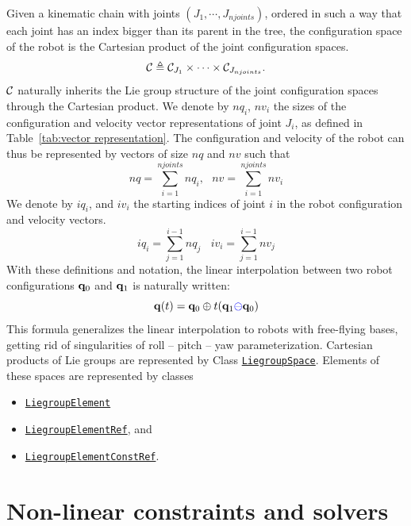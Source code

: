 Given a kinematic chain with joints $(J_1, \cdots, J_{njoints})$, ordered in such
a way that each joint has an index bigger than its parent in the tree, the configuration space of the robot is the Cartesian product of the joint configuration spaces.
$$
\mathcal{C} \triangleq \mathcal{C}_{J_1}\times \cdots \times \mathcal{C}_{J_{njoints}}.
$$
$\mathcal{C}$ naturally inherits the Lie group structure of the joint configuration spaces through the Cartesian product.
We denote by $nq_i$, $nv_i$ the sizes of the configuration and velocity vector representations of joint $J_i$, as defined in Table~\ref{tab:vector representation}.
The configuration and velocity of the robot can thus be represented by vectors of size $nq$ and $nv$ such that
$$
nq = \sum_{i=1}^{njoints} nq_i, \ \ \ nv = \sum_{i=1}^{njoints} nv_i
$$
We denote by $iq_i$, and $iv_i$ the {\color{blue}starting} indices of joint $i$ in the robot configuration and velocity vectors.
$$
iq_i = \sum_{j=1}^{i-1} nq_j\ \ \ \ iv_i = \sum_{j=1}^{i-1} nv_j
$$
With these definitions and notation, the linear interpolation between two robot
configurations $\mathbf{q}_0$ and $\mathbf{q}_1$ is naturally written:
$$
\mathbf{q}(t) = \mathbf{q}_0 \oplus t (\mathbf{q}_1 {\color{blue}\ominus} \mathbf{q}_0)
$$
This formula generalizes the linear interpolation to robots with free-flying bases, getting rid of singularities of roll -- pitch -- yaw parameterization.
Cartesian products of Lie groups are represented by Class \href{https://gepettoweb.laas.fr/hpp/hpp-pinocchio/doxygen-html/classhpp_1_1pinocchio_1_1LiegroupSpace.html}{\texttt{LiegroupSpace}}. Elements of these spaces are represented by classes
\begin{itemize}
\item \href{https://gepettoweb.laas.fr/hpp/hpp-pinocchio/doxygen-html/classhpp_1_1pinocchio_1_1LiegroupElementBase.html}{\texttt{LiegroupElement}}
\item \href{https://gepettoweb.laas.fr/hpp/hpp-pinocchio/doxygen-html/classhpp_1_1pinocchio_1_1LiegroupElementBase.html}{\texttt{LiegroupElementRef}}, and
\item \href{https://gepettoweb.laas.fr/hpp/hpp-pinocchio/doxygen-html/classhpp_1_1pinocchio_1_1LiegroupElementBase.html}{\texttt{LiegroupElementConstRef}}.
  \end{itemize}

\section{Non-linear constraints and solvers}\label{sec:constraints}

